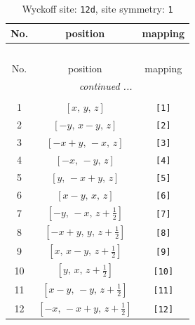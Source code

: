 \documentclass[fleqn,8pt]{jsarticle}
\begin{document}
\begin{longtable}{ccc}
\caption{Wyckoff site: {\tt 12d}, site symmetry: {\tt 1}}
 \\
 \hline \hline
No. & position & mapping \\ \hline \endfirsthead

\multicolumn{2}{l}{\tablename\ \thetable{}} \\
 \hline \hline
No. & position & mapping \\ \hline \endhead

 \hline \hline
\multicolumn{2}{r}{\footnotesize\it continued ...} \\ \endfoot

 \hline \hline
\multicolumn{2}{r}{} \\ \endlastfoot

1 & $\left[ x,\, y,\, z \right]$ & {\tt [1]} \\ \hline
2 & $\left[ - y,\, x - y,\, z \right]$ & {\tt [2]} \\ \hline
3 & $\left[ - x + y,\, - x,\, z \right]$ & {\tt [3]} \\ \hline
4 & $\left[ - x,\, - y,\, z \right]$ & {\tt [4]} \\ \hline
5 & $\left[ y,\, - x + y,\, z \right]$ & {\tt [5]} \\ \hline
6 & $\left[ x - y,\, x,\, z \right]$ & {\tt [6]} \\ \hline
7 & $\left[ - y,\, - x,\, z + \frac{1}{2} \right]$ & {\tt [7]} \\ \hline
8 & $\left[ - x + y,\, y,\, z + \frac{1}{2} \right]$ & {\tt [8]} \\ \hline
9 & $\left[ x,\, x - y,\, z + \frac{1}{2} \right]$ & {\tt [9]} \\ \hline
10 & $\left[ y,\, x,\, z + \frac{1}{2} \right]$ & {\tt [10]} \\ \hline
11 & $\left[ x - y,\, - y,\, z + \frac{1}{2} \right]$ & {\tt [11]} \\ \hline
12 & $\left[ - x,\, - x + y,\, z + \frac{1}{2} \right]$ & {\tt [12]} \\
\end{longtable}
\end{document}
